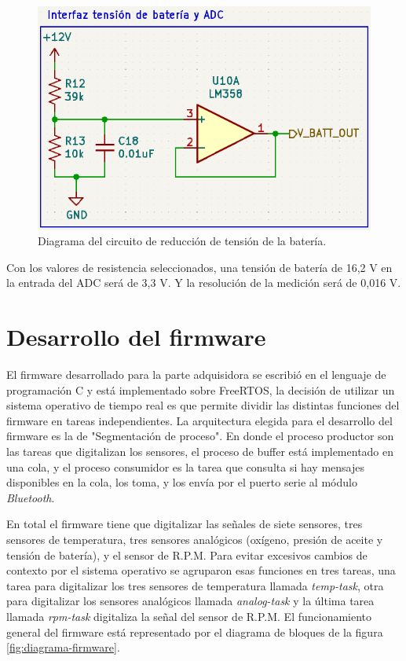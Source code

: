 \begin{figure}[htpb]
\centering
\includegraphics[width=.7\textwidth]{./Figures/ampli-bat.png}
\caption{Diagrama del circuito de reducción de tensión de la batería.}
\label{fig:circuito-bat}
\end{figure}

Con los valores de resistencia seleccionados, una tensión de batería de 16,2 V en la entrada del ADC será de 3,3 V. Y la resolución de la medición será de 0,016 V.

\break

\section{Desarrollo del firmware}

El firmware desarrollado para la parte adquisidora se escribió en el lenguaje de programación C y está implementado sobre FreeRTOS, la decisión de utilizar un sistema operativo de tiempo real es que permite dividir las distintas funciones del firmware en tareas independientes. La arquitectura elegida para el desarrollo del firmware es la de "Segmentación de proceso". En donde el proceso productor son las tareas que digitalizan los sensores, el proceso de buffer está implementado en una cola, y el proceso consumidor es la tarea que consulta si hay mensajes disponibles en la cola, los toma, y los envía por el puerto serie al módulo \textit{Bluetooth}.

En total el firmware tiene que digitalizar las señales de siete sensores, tres sensores de temperatura, tres sensores analógicos (oxígeno, presión de aceite y tensión de batería), y el sensor de R.P.M. Para evitar excesivos cambios de contexto por el sistema operativo se agruparon esas funciones en tres tareas, una tarea para digitalizar los tres sensores de temperatura llamada \textit{temp-task}, otra para digitalizar los sensores analógicos llamada \textit{analog-task} y la última tarea llamada \textit{rpm-task} digitaliza la señal del sensor de R.P.M. El funcionamiento general del firmware está representado por el diagrama de bloques de la figura \ref{fig:diagrama-firmware}.

